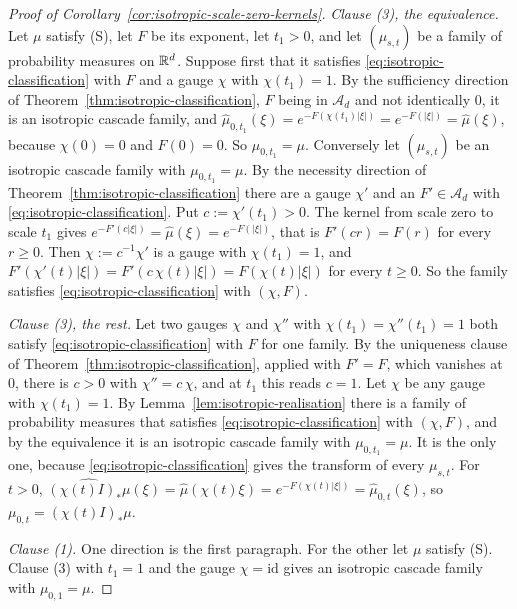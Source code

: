 \begin{proof}[Proof of Corollary~\ref{cor:isotropic-scale-zero-kernels}]
\emph{Clause (3), the equivalence.} Let $\mu$ satisfy (S), let $F$ be its exponent, let
$t_1 > 0$, and let $(\mu_{s,t})$ be a family of probability measures on $\mathbb{R}^d$. Suppose first
that it satisfies \ref{eq:isotropic-classification} with $F$ and a gauge $\chi$ with
$\chi(t_1) = 1$. By the sufficiency direction of Theorem~\ref{thm:isotropic-classification}, $F$ being in
$\mathcal{A}_d$ and not identically $0$, it is an
isotropic cascade family, and
$\widehat\mu_{0,t_1}(\xi) = e^{-F(\chi(t_1)|\xi|)} = e^{-F(|\xi|)} = \widehat\mu(\xi)$, because
$\chi(0) = 0$ and $F(0) = 0$. So $\mu_{0,t_1} = \mu$. Conversely let $(\mu_{s,t})$ be an
isotropic cascade family with $\mu_{0,t_1} = \mu$. By the necessity direction of
Theorem~\ref{thm:isotropic-classification} there are a gauge $\chi'$ and an $F' \in \mathcal{A}_d$ with
\ref{eq:isotropic-classification}. Put $c := \chi'(t_1) > 0$. The kernel from scale zero to
scale $t_1$ gives $e^{-F'(c|\xi|)} = \widehat\mu(\xi) = e^{-F(|\xi|)}$, that is $F'(cr) = F(r)$
for every $r \ge 0$. Then $\chi := c^{-1}\chi'$ is a gauge with $\chi(t_1) = 1$, and
$F'(\chi'(t)|\xi|) = F'(c\,\chi(t)|\xi|) = F(\chi(t)|\xi|)$ for every $t \ge 0$. So the family
satisfies \ref{eq:isotropic-classification} with $(\chi, F)$.

\emph{Clause (3), the rest.} Let two gauges $\chi$ and $\chi''$ with
$\chi(t_1) = \chi''(t_1) = 1$ both satisfy \ref{eq:isotropic-classification} with $F$ for one
family. By the uniqueness clause of Theorem~\ref{thm:isotropic-classification}, applied with $F' = F$,
which vanishes at $0$, there is $c > 0$ with $\chi'' = c\,\chi$, and at $t_1$ this reads $c = 1$.
Let $\chi$ be any gauge with $\chi(t_1) = 1$. By Lemma~\ref{lem:isotropic-realisation} there is a
family of probability measures that satisfies \ref{eq:isotropic-classification} with
$(\chi, F)$, and by the equivalence it is an isotropic cascade family with $\mu_{0,t_1} = \mu$.
It is the only one, because \ref{eq:isotropic-classification} gives the transform of every
$\mu_{s,t}$. For $t > 0$,
$\widehat{(\chi(t)I)_*\mu}(\xi) = \widehat\mu(\chi(t)\xi) = e^{-F(\chi(t)|\xi|)}
= \widehat\mu_{0,t}(\xi)$, so $\mu_{0,t} = (\chi(t)I)_*\mu$.

\emph{Clause (1).} One direction is the first paragraph. For the other let $\mu$ satisfy (S).
Clause (3) with $t_1 = 1$ and the gauge $\chi = \mathrm{id}$ gives an isotropic cascade family
with $\mu_{0,1} = \mu$.


\end{proof}
